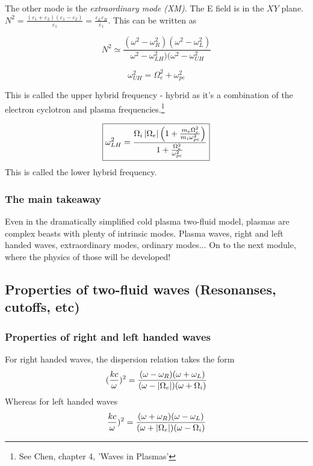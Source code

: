 \documentclass[PlasmaNotes.tex]{subfiles}
\begin{document}
The other mode is the \emph{extraordinary mode (XM)}. The E field is in the $XY$ plane. $N^2 = \frac{(\varepsilon_1+\varepsilon_2)(\varepsilon_1-\varepsilon_2)}{\varepsilon_1} = \frac{\varepsilon_L \varepsilon_R}{\varepsilon_1}$. This can be written as 

\[ N^2 \simeq \frac{(\omega^2-\omega_R^2)(\omega^2-\omega_L^2)}{\omega^2-\omega_{LH}^2)(\omega^2-\omega_{UH}^2} \]

\begin{equation}
\boxed{\omega^2_{UH} = \Omega_e^2 + \omega_{pe}^2}
\end{equation}

This is called the upper hybrid frequency - hybrid as it's a combination of the electron cyclotron and plasma frequencies.\footnote{See Chen, chapter 4, 'Waves in Plasmas'}

\begin{equation}
\boxed{\omega^2_{LH} = \frac{\Omega_i \left| \Omega_e \right| \Big(1+\frac{m_e \Omega_e^2}{m_i\omega_{pe}^2}\Big)}{1+\frac{\Omega_e^2}{\omega_{pe}^2}}}
\end{equation}
This is called the lower hybrid frequency.

\subsubsection{The main takeaway}

Even in the dramatically simplified cold plasma two-fluid model, plasmas are complex beasts with plenty of intrinsic modes. Plasma waves, right and left handed waves, extraordinary modes, ordinary modes... On to the next module, where the physics of those will be developed!




\subsection{Properties of two-fluid waves (Resonanses, cutoffs, etc)}

\subsubsection{Properties of right and left handed waves}


For right handed waves, the dispersion relation takes the form
\[(\frac{k c}{\omega})^2 = \frac{(\omega-\omega_R)(\omega+\omega_L)}{(\omega-\left| \Omega_e \right|)(\omega+\Omega_i)} \]
Whereas for left handed waves
\[ \frac{k c}{\omega})^2 = \frac{(\omega+\omega_R)(\omega-\omega_L)}{(\omega+\left| \Omega_e \right|)(\omega-\Omega_i)} \]
\end{document}
